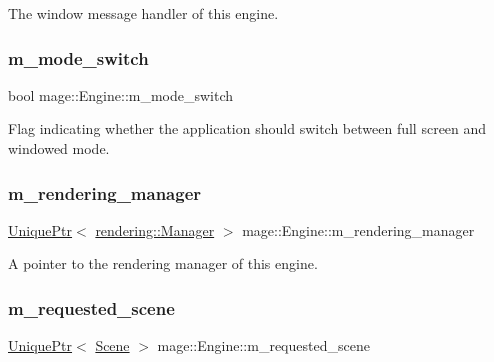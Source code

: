 The window message handler of this engine. \hypertarget{classmage_1_1_engine_aa5cb2e0b7bb2c4a9020e79ab832ee221}{}\label{classmage_1_1_engine_aa5cb2e0b7bb2c4a9020e79ab832ee221} 
\subsubsection{\texorpdfstring{m\+\_\+mode\+\_\+switch}{m\_mode\_switch}}
{\footnotesize\ttfamily bool mage\+::\+Engine\+::m\+\_\+mode\+\_\+switch\hspace{0.3cm}{\ttfamily [private]}}

Flag indicating whether the application should switch between full screen and windowed mode. \hypertarget{classmage_1_1_engine_ae870ec5b532a21112500f0f0f03e9b55}{}\label{classmage_1_1_engine_ae870ec5b532a21112500f0f0f03e9b55} 
\subsubsection{\texorpdfstring{m\+\_\+rendering\+\_\+manager}{m\_rendering\_manager}}
{\footnotesize\ttfamily \hyperlink{namespacemage_a3316d7143a973e37adf1110f2e80ca31}{Unique\+Ptr}$<$ \hyperlink{classmage_1_1rendering_1_1_manager}{rendering\+::\+Manager} $>$ mage\+::\+Engine\+::m\+\_\+rendering\+\_\+manager\hspace{0.3cm}{\ttfamily [private]}}

A pointer to the rendering manager of this engine. \hypertarget{classmage_1_1_engine_a45160eecbdcbebcf269436505342db54}{}\label{classmage_1_1_engine_a45160eecbdcbebcf269436505342db54} 
\subsubsection{\texorpdfstring{m\+\_\+requested\+\_\+scene}{m\_requested\_scene}}
{\footnotesize\ttfamily \hyperlink{namespacemage_a3316d7143a973e37adf1110f2e80ca31}{Unique\+Ptr}$<$ \hyperlink{classmage_1_1_scene}{Scene} $>$ mage\+::\+Engine\+::m\+\_\+requested\+\_\+scene\hspace{0.3cm}{\ttfamily [private]}}

